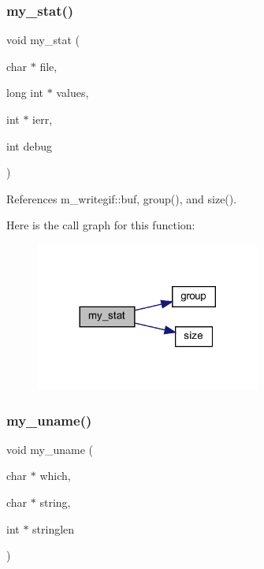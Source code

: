 \subsubsection{\texorpdfstring{my\+\_\+stat()}{my\_stat()}}
{\footnotesize\ttfamily void my\+\_\+stat (\begin{DoxyParamCaption}\item[{char $\ast$}]{file,  }\item[{long int $\ast$}]{values,  }\item[{int $\ast$}]{ierr,  }\item[{int}]{debug }\end{DoxyParamCaption})}



References m\+\_\+writegif\+::buf, group(), and size().

Here is the call graph for this function\+:
\nopagebreak
\begin{figure}[H]
\begin{center}
\leavevmode
\includegraphics[width=209pt]{C-M__system_8c_a93aa717690d60568cf019988f6434ba5_cgraph}
\end{center}
\end{figure}
\mbox{\label{C-M__system_8c_ab341d42a9117c4bd188dcdcbff69fe9a}} 
\subsubsection{\texorpdfstring{my\+\_\+uname()}{my\_uname()}}
{\footnotesize\ttfamily void my\+\_\+uname (\begin{DoxyParamCaption}\item[{char $\ast$}]{which,  }\item[{char $\ast$}]{string,  }\item[{int $\ast$}]{stringlen }\end{DoxyParamCaption})}



